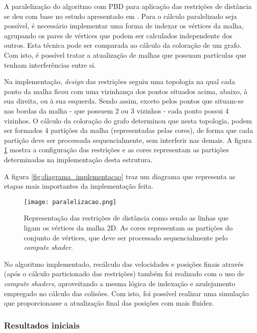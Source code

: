 A paralelização do algoritmo com \acs{PBD} para aplicação das restrições de distância se deu com base no estudo apresentado em \cite{fratarcangeli2013gpu}. Para o cálculo paralelizado seja possível, é necessário implementar uma forma de indexar os vértices da malha, agrupando os pares de vértices que podem ser calculados independente dos outros. Esta técnica pode ser comparada ao cálculo da coloração de um grafo. Com isto, é possível tratar a atualização de malhas que possuam partículas que tenham interferências entre si.

Na implementação, \textit{design} das restrições seguiu uma topologia na qual cada ponto da malha ficou com uma vizinhança dos pontos situados acima, abaixo, à sua direita, ou à sua esquerda. Sendo assim, exceto pelos pontos que situam-se nas bordas da malha - que possuem 2 ou 3 vizinhos - cada ponto possui 4 vizinhos. O cálculo da coloração do grafo determinou que nesta topologia, podem ser formados 4 partições da malha (representadas pelas cores), de forma que cada partição deve ser processada sequencialmente, sem interferir nas demais. A figura \ref{fig:topologia1} mostra a configuração das restrições e as cores representam as partições determinadas na implementação desta estrutura.

A figura \ref{fig:diagrama_implementacao} traz um diagrama que representa as etapas mais importantes da implementação feita.

\begin{figure}
\begin{center} 
\texttt{[image: paralelizacao.png]}
\caption{Representação das restrições de distância como sendo as linhas que ligam os vértices da malha 2D. As cores representam as partições do conjunto de vértices, que deve ser processado sequencialmente pelo \textit{compute shader}.}
\label{fig:topologia1}
\end{center} 
\end{figure}

No algoritmo implementado, recálculo das velocidades e posições finais através (após o cálculo particionado das restrições) também foi realizado com o uso de \textit{compute shaders}, aproveitando a mesma lógica de indexação e azulejamento empregado no cálculo das colisões. Com isto, foi possível realizar uma simulação que proporcionasse a atualização final das posições com mais fluidez.

\subsubsection{Resultados iniciais}

